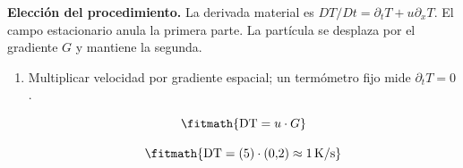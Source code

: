 \noindent\textbf{Elección del procedimiento.} La derivada material es $DT/Dt=\partial_tT+u\partial_xT$. El campo estacionario anula la primera parte. La partícula se desplaza por el gradiente $G$ y mantiene la segunda.

\begin{enumerate}

\item Multiplicar velocidad por gradiente espacial; un termómetro fijo mide $\partial_tT=0$.

\[\fitmath{\mathrm{DT}=u\cdot G}\]

\[\fitmath{\mathrm{DT}=(5)\cdot (0{,}2)\approx 1\,\mathrm{K/s}}\]

\end{enumerate}
